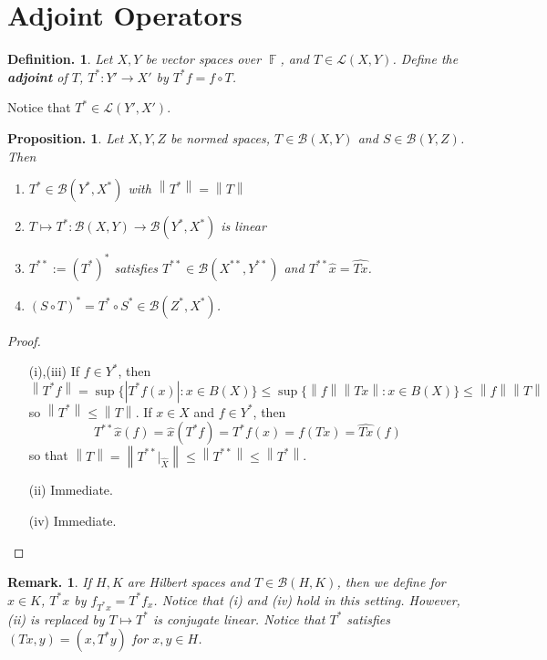 \documentclass[11pt, a4paper]{memoir}
\DeclareMathOperator{\F}{{\mathbb{F}}}
\newcommand{\norm}[1]{\ensuremath{\left\lVert#1\right\rVert}}
\theoremstyle{change}
\newtheorem{proposition}[theorem]{Proposition.}
\theoremstyle{plain}
\theoremstyle{nonumberplain}
\newtheorem{definition}{Definition.}
\newtheorem{remark}{Remark.}
\newtheorem{proof}{Proof}
\numberwithin{equation}{section}
\begin{document}
\section{Adjoint Operators}
\begin{definition}
    Let $X,Y$ be vector spaces over $\F$, and $T\in\mathcal{L}(X,Y)$.
    Define the \textbf{adjoint} of $T$, $T^*:Y'\to X'$ by $T^*f=f\circ T$.
\end{definition}
Notice that $T^*\in \mathcal{L}(Y',X')$.
\begin{proposition}
    Let $X,Y,Z$ be normed spaces, $T\in\mathcal{B}(X,Y)$ and $S\in\mathcal{B}(Y,Z)$.
    Then
    \begin{enumerate}[nl,r]
        \item $T^*\in\mathcal{B}(Y^*,X^*)$ with $\norm{T^*}=\norm{T}$
        \item $T\mapsto T^*:\mathcal{B}(X,Y)\to\mathcal{B}(Y^*,X^*)$ is linear
        \item $T^{**}:=(T^*)^*$ satisfies $T^{**}\in\mathcal{B}(X^{**},Y^{**})$ and $T^{**}\hat x=\widehat{Tx}$.
        \item $(S\circ T)^*=T^*\circ S^*\in\mathcal{B}(Z^*,X^*)$.
    \end{enumerate}
\end{proposition}
\begin{proof}
    \begin{enumerate}[nl,r]
        \item[(i),(iii)] If $f\in Y^*$, then
            \begin{equation*}
                \norm{T^*f}=\sup\{|T^*f(x)|:x\in B(X)\}\leq\sup\{\norm{f}\norm{Tx}:x\in B(X)\}\leq\norm{f}\norm{T}
            \end{equation*}
            so $\norm{T^*}\leq\norm{T}$.
            If $x\in X$ and $f\in Y^*$, then
            \begin{equation*}
                T^{**}\hat{x}(f)=\hat{x}(T^*f)=T^*f(x)=f(Tx)=\widehat{Tx}(f)
            \end{equation*}
            so that $\norm{T}=\norm{T^{**}|_{\hat X}}\leq\norm{T^{**}}\leq\norm{T^*}$.
        \item[(ii)] Immediate.
        \item[(iv)] Immediate.
    \end{enumerate}
\end{proof}
\begin{remark}
    If $H,K$ are Hilbert spaces and $T\in\mathcal{B}(H,K)$, then we define for $x\in K$, $T^*x$ by $f_{T^*x}=T^*f_x$.
    Notice that (i) and (iv) hold in this setting.
    However, (ii) is replaced by $T\mapsto T^*$ is conjugate linear.
    Notice that $T^*$ satisfies $(Tx,y)=(x,T^*y)$ for $x,y\in H$.
\end{remark}
\end{document}
